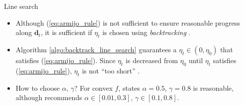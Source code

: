 \documentclass{beamer}
\numberwithin{equation}{section}
\newcommand{\aref}[1]{\alert{\ref{#1}}}
\begin{document}
\begin{frame}{Line search}
    \begin{itemize}
        \item
        Although (\aref{eq:armijo_rule}) is not sufficient to ensure
        reasonable progress along $ \mathbf{d}_t $, it is sufficient if
        $ \eta_t $ is chosen using \textit{backtracking} \cite{nocedal_opt}.

        \medskip

	    \begin{centering}
	    \end{centering}

	    \medskip

        \item
        Algorithm \aref{algo:backtrack_line_search} guarantees a
        $ \eta_t \in (0, \eta_0) $ that satisfies (\aref{eq:armijo_rule}). 
        Since $ \eta_t $ is decreased from $ \eta_0 $ until $ \eta_t $
        satisfies (\aref{eq:armijo_rule}), $ \eta_t $ is not ``too short''
        \cite{nocedal_opt}.

        \item
        How to choose $ \alpha $, $ \gamma $? For convex $ f $,
        \cite{stat_learn_sparsity} states $ \alpha = 0.5 $, $ \gamma = 0.8 $
        is reasonable, although \cite{bv_convex_opt} recommends
        $ \alpha \in [0.01, 0.3] $, $ \gamma \in [0.1, 0.8] $.
    \end{itemize}
\end{frame}
\end{document}
